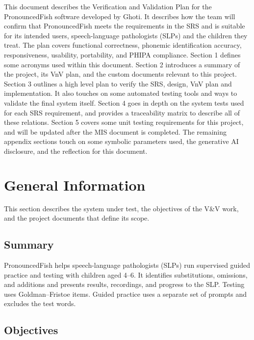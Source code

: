\documentclass[12pt, titlepage]{article}
\begin{document}
\newpage



This document describes the Verification and Validation Plan for the 
PronouncedFish software developed by Ghoti. It describes how the team will confirm 
that PronouncedFish meets the requirements in the SRS and is suitable for its 
intended users, speech-language pathologists (SLPs) and the children they treat. 
The plan covers functional correctness, phonemic identification accuracy, 
responsiveness, usability, portability, and PHIPA compliance. 
Section 1 defines some acronyms used within this 
document. Section 2 introduces a summary of the project, its VnV plan, and 
the custom documents relevant to this project. Section 3 outlines a high 
level plan to verify the SRS, design, VnV plan and implementation. It also 
touches on some automated testing tools and ways to validate the final 
system itself. Section 4 goes in depth on the system tests used for each 
SRS requirement, and provides a traceability matrix to describe all of these 
relations. Section 5 covers some unit testing requirements for this project, 
and will be updated after the MIS document is completed. The remaining appendix sections 
touch on some symbolic parameters used, the generative AI disclosure, and 
the reflection for this document. 

\section{General Information}

This section describes the system under test, the objectives of the V\&V
work, and the project documents that define its scope.

\subsection{Summary}

PronouncedFish helps speech-language pathologists (SLPs) run supervised
guided practice and testing with children aged 4--6. It identifies
substitutions, omissions, and additions and presents results, recordings,
and progress to the SLP. Testing uses Goldman--Fristoe items. Guided practice
uses a separate set of prompts and excludes the test words.

\subsection{Objectives}
\end{document}
